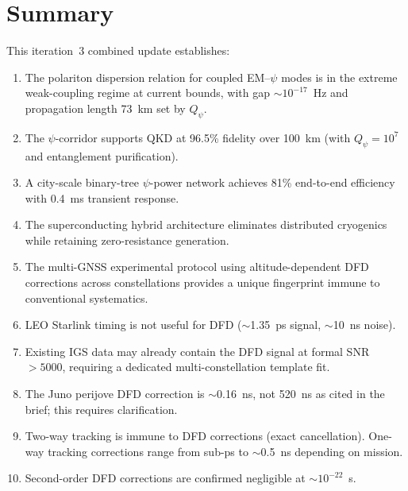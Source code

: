 \documentclass[aps,prd,twocolumn,superscriptaddress,nofootinbib]{revtex4-2}
\newcommand{\Qpsi}{Q_\psi}
\begin{document}
\section{Summary}
\label{sec:summary}

This iteration~3 combined update establishes:

\begin{enumerate}
\item The polariton dispersion relation for coupled EM--$\psi$ modes
is in the extreme weak-coupling regime at current bounds, with
gap $\sim 10^{-17}$~Hz and propagation length 73~km set by $\Qpsi$.

\item The $\psi$-corridor supports QKD at 96.5\% fidelity over 100~km
(with $\Qpsi = 10^7$ and entanglement purification).

\item A city-scale binary-tree $\psi$-power network achieves 81\%
end-to-end efficiency with 0.4~ms transient response.

\item The superconducting hybrid architecture eliminates distributed
cryogenics while retaining zero-resistance generation.

\item The multi-GNSS experimental protocol using altitude-dependent
DFD corrections across constellations provides a unique fingerprint
immune to conventional systematics.

\item LEO Starlink timing is not useful for DFD ($\sim$1.35~ps signal,
$\sim$10~ns noise).

\item Existing IGS data may already contain the DFD signal at
formal SNR $>5000$, requiring a dedicated multi-constellation
template fit.

\item The Juno perijove DFD correction is $\sim$0.16~ns, not 520~ns
as cited in the brief; this requires clarification.

\item Two-way tracking is immune to DFD corrections (exact cancellation).
One-way tracking corrections range from sub-ps to $\sim$0.5~ns
depending on mission.

\item Second-order DFD corrections are confirmed negligible at
$\sim 10^{-22}$~s.
\end{enumerate}
\end{document}
